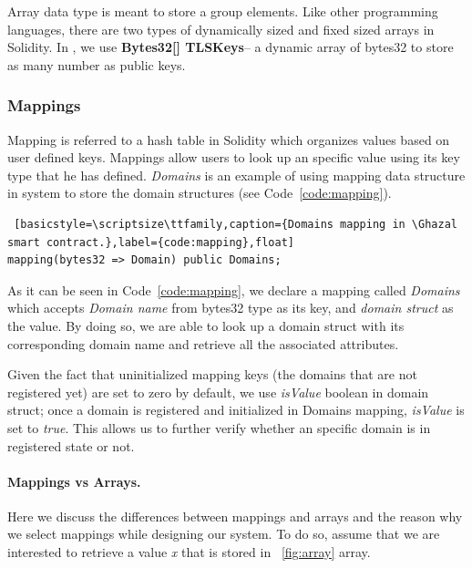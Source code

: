 Array data type is meant to store a group elements. Like other programming languages, there are two types of dynamically sized and fixed sized arrays in Solidity. In \Ghazalstar, we use \textbf{Bytes32[] TLSKeys}-- a dynamic array of bytes32 to store as many number as public keys.
\subsubsection*{Mappings}

Mapping is referred to a hash table in Solidity which organizes values based on user defined keys. Mappings allow users to look up an specific value using its key type that he has defined. \emph{Domains} is an example of using mapping data structure in \Ghazalstar system to store the domain structures (see Code~\ref{code:mapping}).


\begin{lstlisting} [basicstyle=\scriptsize\ttfamily,caption={Domains mapping in \Ghazal smart contract.},label={code:mapping},float]
mapping(bytes32 => Domain) public Domains;
\end{lstlisting}

As it can be seen in Code~\ref{code:mapping}, we declare a mapping called \emph{Domains} which accepts \emph{Domain name} from bytes32 type as its key, and \emph{domain struct} as the value. By doing so, we are able to look up a domain struct with its corresponding domain name and retrieve all the associated attributes. 

Given the fact that uninitialized mapping keys (the domains that are not registered yet) are set to zero by default, we use \emph{isValue} boolean in domain struct; once a domain is registered and initialized in Domains mapping, \emph{isValue} is set to \emph{true}. This allows us to further verify whether an specific domain is in registered state or not.

\paragraph{Mappings vs Arrays.}\label{MapvsArray} Here we discuss the differences between mappings and arrays and the reason why we select mappings while designing our system. To do so, assume that we are interested to retrieve a value \emph{x} that is stored in ~\ref{fig:array} array.

